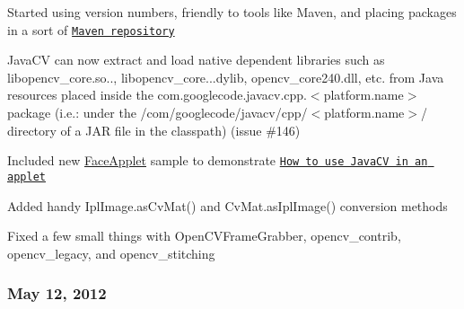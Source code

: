 \begin{DoxyItemize}
\item Started using version numbers, friendly to tools like Maven, and placing packages in a sort of \href{http://maven2.javacv.googlecode.com/git/}{\tt Maven repository}
\item Java\+C\+V can now extract and load native dependent libraries such as {\ttfamily libopencv\+\_\+core.\+so..}, {\ttfamily libopencv\+\_\+core...\+dylib}, {\ttfamily opencv\+\_\+core240.\+dll}, etc. from Java resources placed inside the {\ttfamily com.\+googlecode.\+javacv.\+cpp.$<$platform.\+name$>$} package (i.\+e.\+: under the {\ttfamily /com/googlecode/javacv/cpp/$<$platform.\+name$>$/} directory of a J\+A\+R file in the classpath) (issue \#146)
\item Included new {\ttfamily \hyperlink{class_face_applet}{Face\+Applet}} sample to demonstrate \href{http://code.google.com/p/javacv/wiki/HowToMakeAnApplet}{\tt How to use Java\+C\+V in an applet}
\item Added handy {\ttfamily Ipl\+Image.\+as\+Cv\+Mat()} and {\ttfamily Cv\+Mat.\+as\+Ipl\+Image()} conversion methods
\item Fixed a few small things with {\ttfamily Open\+C\+V\+Frame\+Grabber}, {\ttfamily opencv\+\_\+contrib}, {\ttfamily opencv\+\_\+legacy}, and {\ttfamily opencv\+\_\+stitching}
\end{DoxyItemize}

\subsubsection*{May 12, 2012}


